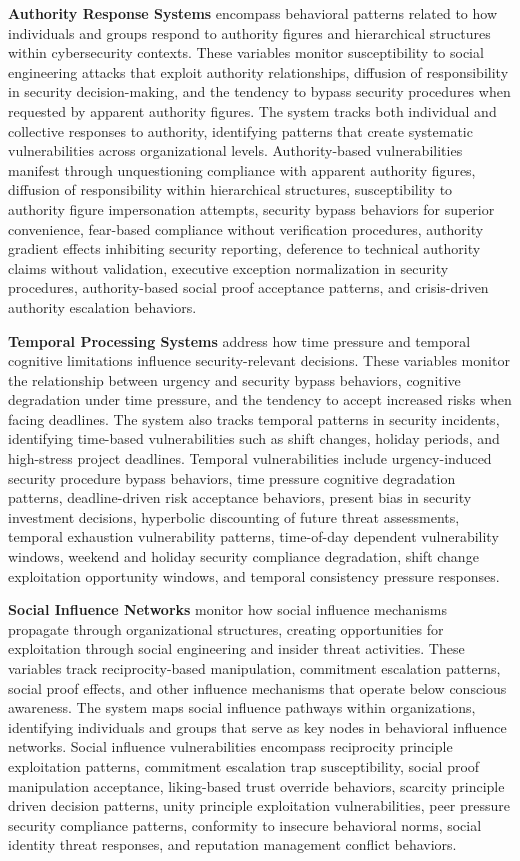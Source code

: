 \documentclass[journal]{IEEEtran}
\begin{document}
\textbf{Authority Response Systems} encompass behavioral patterns related to how individuals and groups respond to authority figures and hierarchical structures within cybersecurity contexts. These variables monitor susceptibility to social engineering attacks that exploit authority relationships, diffusion of responsibility in security decision-making, and the tendency to bypass security procedures when requested by apparent authority figures. The system tracks both individual and collective responses to authority, identifying patterns that create systematic vulnerabilities across organizational levels. Authority-based vulnerabilities manifest through unquestioning compliance with apparent authority figures, diffusion of responsibility within hierarchical structures, susceptibility to authority figure impersonation attempts, security bypass behaviors for superior convenience, fear-based compliance without verification procedures, authority gradient effects inhibiting security reporting, deference to technical authority claims without validation, executive exception normalization in security procedures, authority-based social proof acceptance patterns, and crisis-driven authority escalation behaviors.

\textbf{Temporal Processing Systems} address how time pressure and temporal cognitive limitations influence security-relevant decisions. These variables monitor the relationship between urgency and security bypass behaviors, cognitive degradation under time pressure, and the tendency to accept increased risks when facing deadlines. The system also tracks temporal patterns in security incidents, identifying time-based vulnerabilities such as shift changes, holiday periods, and high-stress project deadlines. Temporal vulnerabilities include urgency-induced security procedure bypass behaviors, time pressure cognitive degradation patterns, deadline-driven risk acceptance behaviors, present bias in security investment decisions, hyperbolic discounting of future threat assessments, temporal exhaustion vulnerability patterns, time-of-day dependent vulnerability windows, weekend and holiday security compliance degradation, shift change exploitation opportunity windows, and temporal consistency pressure responses.

\textbf{Social Influence Networks} monitor how social influence mechanisms propagate through organizational structures, creating opportunities for exploitation through social engineering and insider threat activities. These variables track reciprocity-based manipulation, commitment escalation patterns, social proof effects, and other influence mechanisms that operate below conscious awareness. The system maps social influence pathways within organizations, identifying individuals and groups that serve as key nodes in behavioral influence networks. Social influence vulnerabilities encompass reciprocity principle exploitation patterns, commitment escalation trap susceptibility, social proof manipulation acceptance, liking-based trust override behaviors, scarcity principle driven decision patterns, unity principle exploitation vulnerabilities, peer pressure security compliance patterns, conformity to insecure behavioral norms, social identity threat responses, and reputation management conflict behaviors.
\end{document}
